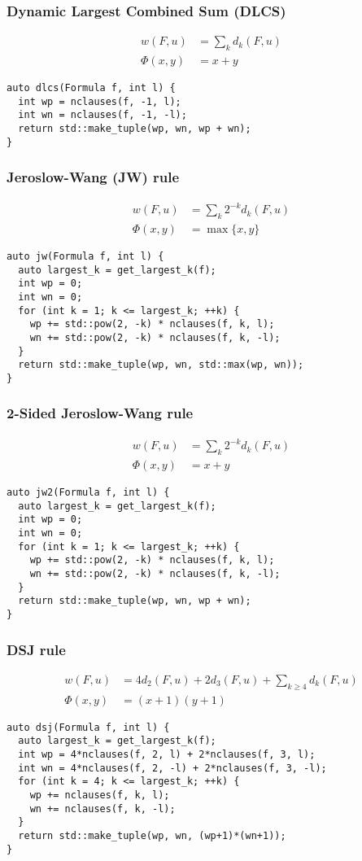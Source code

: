 \documentclass[10pt,AMS Euler]{article}
\begin{document}
\subsubsection*{Dynamic Largest Combined Sum (DLCS)}
\label{sec:org30c3559}
\begin{align*}
w(F,u) &= \sum_k d_k(F,u) \\
\Phi(x,y) &= x + y
\end{align*}
\begin{verbatim}
auto dlcs(Formula f, int l) {
  int wp = nclauses(f, -1, l);
  int wn = nclauses(f, -1, -l);
  return std::make_tuple(wp, wn, wp + wn);
}
\end{verbatim}
\subsubsection*{Jeroslow-Wang (JW) rule}
\label{sec:orgbb44a4a}
\begin{align*}
w(F,u) &= \sum_k 2^{-k} d_k(F,u) \\
\Phi(x,y) &= \max\{x,y\}
\end{align*}
\begin{verbatim}
auto jw(Formula f, int l) {
  auto largest_k = get_largest_k(f);
  int wp = 0;
  int wn = 0;
  for (int k = 1; k <= largest_k; ++k) {
    wp += std::pow(2, -k) * nclauses(f, k, l);
    wn += std::pow(2, -k) * nclauses(f, k, -l);
  }
  return std::make_tuple(wp, wn, std::max(wp, wn));
}
\end{verbatim}
\subsubsection*{2-Sided Jeroslow-Wang rule}
\label{sec:org1f5c697}
\begin{align*}
w(F,u) &= \sum_k 2^{-k} d_k(F,u) \\
\Phi(x,y) &= x + y
\end{align*}
\begin{verbatim}
auto jw2(Formula f, int l) {
  auto largest_k = get_largest_k(f);
  int wp = 0;
  int wn = 0;
  for (int k = 1; k <= largest_k; ++k) {
    wp += std::pow(2, -k) * nclauses(f, k, l);
    wn += std::pow(2, -k) * nclauses(f, k, -l);
  }
  return std::make_tuple(wp, wn, wp + wn);
}
\end{verbatim}
\subsubsection*{DSJ rule}
\label{sec:orgee8bf4a}
\begin{align*}
w(F,u) &= 4d_2(F,u) + 2d_3(F,u) + \sum_{k\geq 4} d_k(F,u) \\
\Phi(x,y) &= (x+1)(y+1)
\end{align*}
\begin{verbatim}
auto dsj(Formula f, int l) {
  auto largest_k = get_largest_k(f);
  int wp = 4*nclauses(f, 2, l) + 2*nclauses(f, 3, l);
  int wn = 4*nclauses(f, 2, -l) + 2*nclauses(f, 3, -l);
  for (int k = 4; k <= largest_k; ++k) {
    wp += nclauses(f, k, l);
    wn += nclauses(f, k, -l);
  }
  return std::make_tuple(wp, wn, (wp+1)*(wn+1));
}
\end{verbatim}
\end{document}
